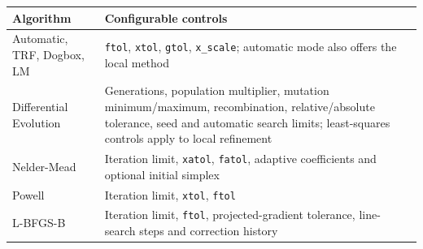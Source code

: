 \documentclass[
  10pt,
  a4paper,
  oneside]{scrreprt}
\begin{document}
\begin{longtable}[]{@{}ll@{}}
\toprule
\begin{minipage}[b]{0.47\columnwidth}\raggedright
Algorithm\strut
\end{minipage} & \begin{minipage}[b]{0.47\columnwidth}\raggedright
Configurable controls\strut
\end{minipage}\tabularnewline
\midrule
\endhead
\begin{minipage}[t]{0.47\columnwidth}\raggedright
Automatic, TRF, Dogbox, LM\strut
\end{minipage} & \begin{minipage}[t]{0.47\columnwidth}\raggedright
\texttt{ftol}, \texttt{xtol}, \texttt{gtol}, \texttt{x\_scale};
automatic mode also offers the local method\strut
\end{minipage}\tabularnewline
\begin{minipage}[t]{0.47\columnwidth}\raggedright
Differential Evolution\strut
\end{minipage} & \begin{minipage}[t]{0.47\columnwidth}\raggedright
Generations, population multiplier, mutation minimum/maximum,
recombination, relative/absolute tolerance, seed and automatic search
limits; least-squares controls apply to local refinement\strut
\end{minipage}\tabularnewline
\begin{minipage}[t]{0.47\columnwidth}\raggedright
Nelder-Mead\strut
\end{minipage} & \begin{minipage}[t]{0.47\columnwidth}\raggedright
Iteration limit, \texttt{xatol}, \texttt{fatol}, adaptive coefficients
and optional initial simplex\strut
\end{minipage}\tabularnewline
\begin{minipage}[t]{0.47\columnwidth}\raggedright
Powell\strut
\end{minipage} & \begin{minipage}[t]{0.47\columnwidth}\raggedright
Iteration limit, \texttt{xtol}, \texttt{ftol}\strut
\end{minipage}\tabularnewline
\begin{minipage}[t]{0.47\columnwidth}\raggedright
L-BFGS-B\strut
\end{minipage} & \begin{minipage}[t]{0.47\columnwidth}\raggedright
Iteration limit, \texttt{ftol}, projected-gradient tolerance,
line-search steps and correction history\strut
\end{minipage}\tabularnewline
\bottomrule
\end{longtable}
\end{document}
